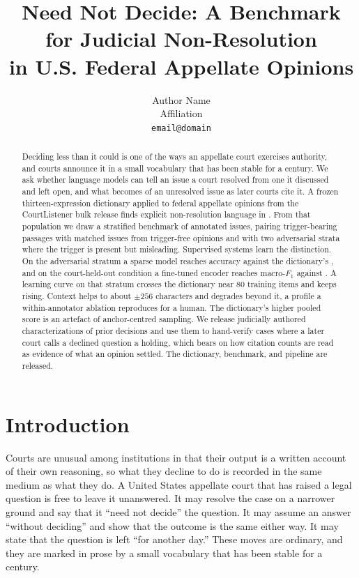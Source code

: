 \documentclass[11pt]{article}
\title{Need Not Decide: A Benchmark for Judicial Non-Resolution\\
in U.S. Federal Appellate Opinions}
\author{Author Name \\
  Affiliation \\
  \texttt{email@domain}}
\begin{document}
\maketitle

\begin{abstract}
Deciding less than it could is one of the ways an appellate court exercises
authority, and courts announce it in a small vocabulary that has been stable for
a century. We ask whether language models can tell an issue a court resolved
from one it discussed and left open, and what becomes of an unresolved issue as
later courts cite it. A frozen thirteen-expression dictionary applied to
\NEligible{} federal appellate opinions from the CourtListener bulk release finds
explicit non-resolution language in \Prevalence{}. From that population we draw a
stratified benchmark of \NBench{} annotated issues, pairing trigger-bearing passages
with matched issues from trigger-free opinions and with two adversarial strata
where the trigger is present but misleading. Supervised systems learn the
distinction. On the adversarial stratum a sparse model reaches \TfidfHOne{} accuracy
against the dictionary's \LexHOne{}, and on the court-held-out condition a fine-tuned
encoder reaches \EncCourt{} macro-$F_1$ against \LexCourt{}. A learning curve on that
stratum crosses the dictionary near 80 training items and keeps rising. Context
helps to about $\pm256$ characters and degrades beyond it, a profile a within-annotator
ablation reproduces for a human. The dictionary's higher pooled score is an
artefact of anchor-centred sampling. We release \NCharTight{} judicially authored
characterizations of prior decisions and use them to hand-verify cases where a
later court calls a declined question a holding, which bears on how citation
counts are read as evidence of what an opinion settled. The dictionary,
benchmark, and pipeline are released.
\end{abstract}

\section{Introduction}

Courts are unusual among institutions in that their output is a written account
of their own reasoning, so what they decline to do is recorded in the same
medium as what they do. A United States appellate court that has raised a legal
question is free to leave it unanswered. It may resolve the case on a narrower
ground and say that it ``need not decide'' the question. It may assume an answer
``without deciding'' and show that the outcome is the same either way. It may
state that the question is left ``for another day.'' These moves are ordinary,
and they are marked in prose by a small vocabulary that has been stable for a
century.
\end{document}
